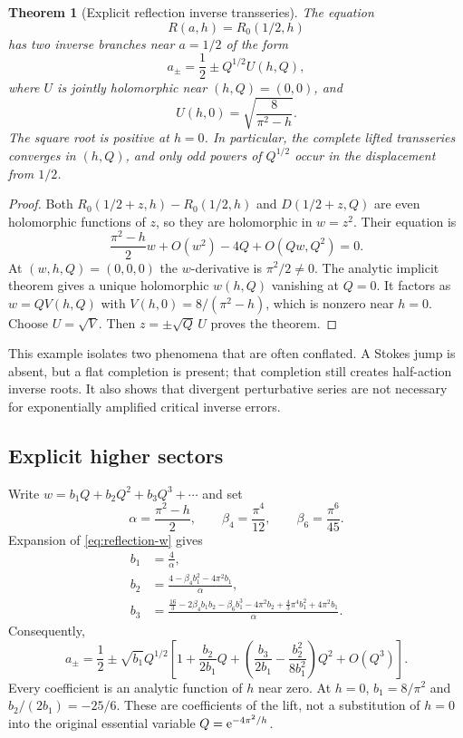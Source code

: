 \documentclass[11pt,a4paper]{article}
\numberwithin{equation}{section}
\newtheorem{theorem}{Theorem}[section]
\theoremstyle{definition}
\theoremstyle{remark}\newtheorem{remark}[theorem]{Remark}
\begin{document}
\begin{theorem}[Explicit reflection inverse transseries]
\label{thm:reflection}
The equation
\begin{equation}\label{eq:reflection-target}
 R(a,h)=R_0(1/2,h)
\end{equation}
has two inverse branches near $a=1/2$ of the form
\begin{equation}\label{eq:reflection-exact}
 a_\pm=\frac12\pm Q^{1/2}U(h,Q),
\end{equation}
where $U$ is jointly holomorphic near $(h,Q)=(0,0)$, and
\begin{equation}\label{eq:reflection-U0}
 U(h,0)=\sqrt{\frac8{\pi^2-h}}.
\end{equation}
The square root is positive at $h=0$. In particular, the complete
lifted transseries converges in $(h,Q)$, and only odd powers of
$Q^{1/2}$ occur in the displacement from $1/2$.
\end{theorem}
\begin{proof}
Both $R_0(1/2+z,h)-R_0(1/2,h)$ and $D(1/2+z,Q)$ are even holomorphic
functions of $z$, so they are holomorphic in $w=z^2$. Their equation is
\begin{equation}\label{eq:reflection-w}
 \frac{\pi^2-h}{2}w+O(w^2)-4Q+O(Qw,Q^2)=0.
\end{equation}
At $(w,h,Q)=(0,0,0)$ the $w$-derivative is $\pi^2/2\ne0$.
The analytic implicit theorem gives a unique holomorphic $w(h,Q)$
vanishing at $Q=0$. It factors as $w=QV(h,Q)$ with
$V(h,0)=8/(\pi^2-h)$, which is nonzero near $h=0$.
Choose $U=\sqrt V$. Then $z=\pm\sqrt Q\,U$ proves the theorem.
\end{proof}
This example isolates two phenomena that are often conflated. A Stokes
jump is absent, but a flat completion is present; that completion still
creates half-action inverse roots. It also shows that divergent
perturbative series are not necessary for exponentially amplified
critical inverse errors.

\subsection{Explicit higher sectors}
Write $w=b_1Q+b_2Q^2+b_3Q^3+\cdots$ and set
\[
 \alpha=\frac{\pi^2-h}{2},\qquad
 \beta_4=\frac{\pi^4}{12},\qquad\beta_6=\frac{\pi^6}{45}.
\]
Expansion of \eqref{eq:reflection-w} gives
\begin{align}
 b_1&=\frac4\alpha,\label{eq:rb1}\\
 b_2&=\frac{4-\beta_4b_1^2-4\pi^2b_1}{\alpha},\label{eq:rb2}\\
 b_3&=\frac{\frac{16}{3}-2\beta_4b_1b_2-\beta_6b_1^3
            -4\pi^2b_2+\frac43\pi^4b_1^2+4\pi^2b_1}{\alpha}.
            \label{eq:rb3}
\end{align}
Consequently,
\begin{equation}\label{eq:reflection-three}
 a_\pm=\frac12\pm\sqrt{b_1}Q^{1/2}
 \left[1+\frac{b_2}{2b_1}Q+
 \left(\frac{b_3}{2b_1}-\frac{b_2^2}{8b_1^2}\right)Q^2+O(Q^3)\right].
\end{equation}
Every coefficient is an analytic function of $h$ near zero. At $h=0$,
$b_1=8/\pi^2$ and $b_2/(2b_1)=-25/6$. These are coefficients of the
lift, not a substitution of $h=0$ into the original essential variable
$Q=\mathrm e^{-4\pi^2/h}$.
\end{document}
